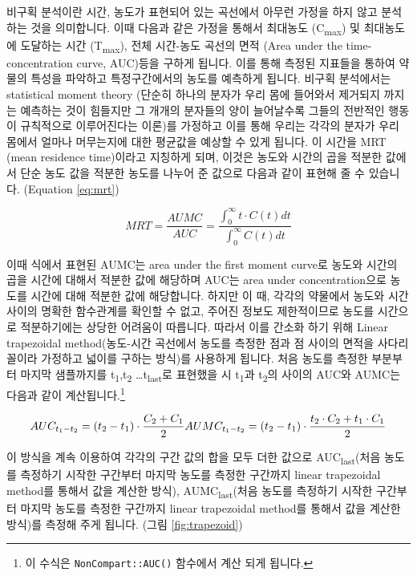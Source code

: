 \documentclass[12pt,]{krantz}
\let\rmarkdownfootnote\footnote%
\def\footnote{\protect\rmarkdownfootnote}
\theoremstyle{definition}
\theoremstyle{definition}
\theoremstyle{definition}
\theoremstyle{remark}
\begin{document}
비구획 분석이란 시간, 농도가 표현되어 있는 곡선에서 아무런 가정을 하지
않고 분석하는 것을 의미합니다. 이때 다음과 같은 가정을 통해서 최대농도
(C\textsubscript{max}) 및 최대농도에 도달하는 시간
(T\textsubscript{max}), 전체 시간-농도 곡선의 면적 (Area under the
time-concentration curve, AUC)등을 구하게 됩니다. 이를 통해 측정된
지표들을 통하여 약물의 특성을 파악하고 특정구간에서의 농도를 예측하게
됩니다. 비구획 분석에서는 statistical moment theory (단순히 하나의
분자가 우리 몸에 들어와서 제거되지 까지는 예측하는 것이 힘들지만 그
개개의 분자들의 양이 늘어날수록 그들의 전반적인 행동이 규칙적으로
이루어진다는 이론)를 가정하고 이를 통해 우리는 각각의 분자가 우리 몸에서
얼마나 머무는지에 대한 평균값을 예상할 수 있게 됩니다. 이 시간을 MRT
(mean residence time)이라고 지칭하게 되며, 이것은 농도와 시간의 곱을
적분한 값에서 단순 농도 값을 적분한 농도를 나누어 준 값으로 다음과 같이
표현해 줄 수 있습니다. (Equation \eqref{eq:mrt})

\[
\begin{equation}
  MRT = \frac{AUMC}{AUC} = \frac{\int_{0}^{\infty} t \cdot C(t) dt}{\int_{0}^{\infty} C(t) dt}
  \label{eq:mrt}
\end{equation}
\]

이때 식에서 표현된 AUMC는 area under the first moment curve로 농도와
시간의 곱을 시간에 대해서 적분한 값에 해당하며 AUC는 area under
concentration으로 농도를 시간에 대해 적분한 값에 해당합니다. 하지만 이
때, 각각의 약물에서 농도와 시간 사이의 명확한 함수관계를 확인할 수 없고,
주어진 정보도 제한적이므로 농도를 시간으로 적분하기에는 상당한 어려움이
따릅니다. 따라서 이를 간소화 하기 위해 Linear trapezoidal
method(농도-시간 곡선에서 농도를 측정한 점과 점 사이의 면적을
사다리꼴이라 가정하고 넓이를 구하는 방식)를 사용하게 됩니다. 처음 농도를
측정한 부분부터 마지막 샘플까지를 t\textsubscript{1},t\textsubscript{2}
\ldots{}t\textsubscript{last}로 표현했을 시 t\textsubscript{1}과
t\textsubscript{2}의 사이의 AUC와 AUMC는 다음과 같이
계산됩니다.\footnote{이 수식은 \texttt{NonCompart::AUC()} 함수에서 계산
  되게 됩니다.}

\[
AUC_{t_1-t_2} = 
  (t_2-t_1)\cdot \frac{C_2+C_1}{2} \\
AUMC_{t_1-t_2} = 
  (t_2-t_1)\cdot \frac{t_2 \cdot C_2 + t_1 \cdot C_1}{2}
\]

이 방식을 계속 이용하여 각각의 구간 값의 합을 모두 더한 값으로
AUC\textsubscript{last}(처음 농도를 측정하기 시작한 구간부터 마지막
농도를 측정한 구간까지 linear trapezoidal method를 통해서 값을 계산한
방식), AUMC\textsubscript{last}(처음 농도를 측정하기 시작한 구간부터
마지막 농도를 측정한 구간까지 linear trapezoidal method를 통해서 값을
계산한 방식)를 측정해 주게 됩니다. (그림 \ref{fig:trapezoid})
\end{document}
